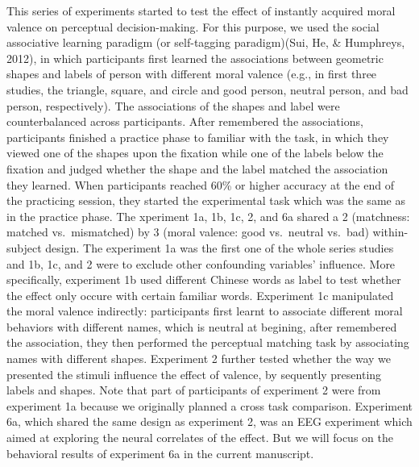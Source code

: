 \documentclass[man]{apa6}
\begin{document}
This series of experiments started to test the effect of instantly acquired moral valence on perceptual decision-making. For this purpose, we used the social associative learning paradigm (or self-tagging paradigm)(Sui, He, \& Humphreys, 2012), in which participants first learned the associations between geometric shapes and labels of person with different moral valence (e.g., in first three studies, the triangle, square, and circle and good person, neutral person, and bad person, respectively). The associations of the shapes and label were counterbalanced across participants. After remembered the associations, participants finished a practice phase to familiar with the task, in which they viewed one of the shapes upon the fixation while one of the labels below the fixation and judged whether the shape and the label matched the association they learned. When participants reached 60\% or higher accuracy at the end of the practicing session, they started the experimental task which was the same as in the practice phase.
The xperiment 1a, 1b, 1c, 2, and 6a shared a 2 (matchness: matched vs.~mismatched) by 3 (moral valence: good vs.~neutral vs.~bad) within-subject design. The experiment 1a was the first one of the whole series studies and 1b, 1c, and 2 were to exclude other confounding variables' influence. More specifically, experiment 1b used different Chinese words as label to test whether the effect only occure with certain familiar words. Experiment 1c manipulated the moral valence indirectly: participants first learnt to associate different moral behaviors with different names, which is neutral at begining, after remembered the association, they then performed the perceptual matching task by associating names with different shapes. Experiment 2 further tested whether the way we presented the stimuli influence the effect of valence, by sequently presenting labels and shapes. Note that part of participants of experiment 2 were from experiment 1a because we originally planned a cross task comparison. Experiment 6a, which shared the same design as experiment 2, was an EEG experiment which aimed at exploring the neural correlates of the effect. But we will focus on the behavioral results of experiment 6a in the current manuscript.
\end{document}
